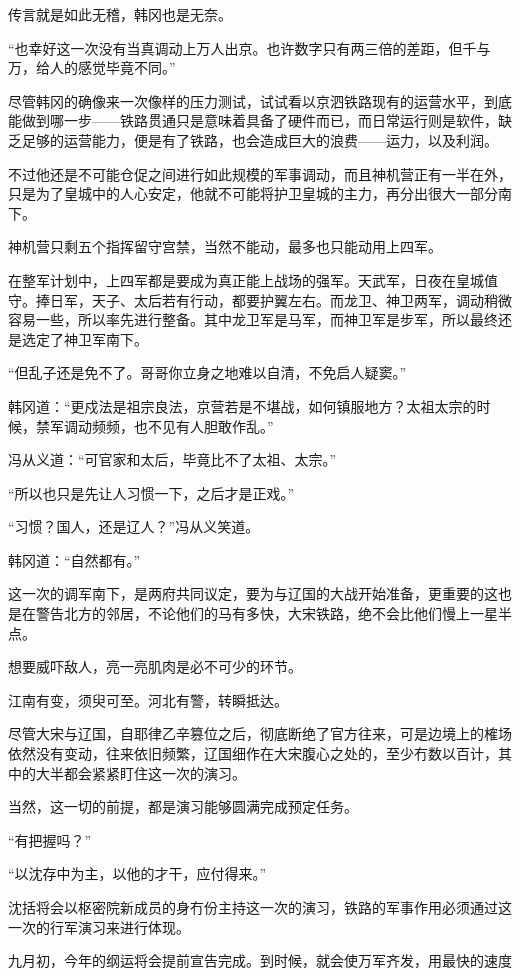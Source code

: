 传言就是如此无稽，韩冈也是无奈。

“也幸好这一次没有当真调动上万人出京。也许数字只有两三倍的差距，但千与万，给人的感觉毕竟不同。”

尽管韩冈的确像来一次像样的压力测试，试试看以京泗铁路现有的运营水平，到底能做到哪一步——铁路贯通只是意味着具备了硬件而已，而日常运行则是软件，缺乏足够的运营能力，便是有了铁路，也会造成巨大的浪费——运力，以及利润。

不过他还是不可能仓促之间进行如此规模的军事调动，而且神机营正有一半在外，只是为了皇城中的人心安定，他就不可能将护卫皇城的主力，再分出很大一部分南下。

神机营只剩五个指挥留守宫禁，当然不能动，最多也只能动用上四军。

在整军计划中，上四军都是要成为真正能上战场的强军。天武军，日夜在皇城值守。捧日军，天子、太后若有行动，都要护翼左右。而龙卫、神卫两军，调动稍微容易一些，所以率先进行整备。其中龙卫军是马军，而神卫军是步军，所以最终还是选定了神卫军南下。

“但乱子还是免不了。哥哥你立身之地难以自清，不免启人疑窦。”

韩冈道：“更戍法是祖宗良法，京营若是不堪战，如何镇服地方？太祖太宗的时候，禁军调动频频，也不见有人胆敢作乱。”

冯从义道：“可官家和太后，毕竟比不了太祖、太宗。”

“所以也只是先让人习惯一下，之后才是正戏。”

“习惯？国人，还是辽人？”冯从义笑道。

韩冈道：“自然都有。”

这一次的调军南下，是两府共同议定，要为与辽国的大战开始准备，更重要的这也是在警告北方的邻居，不论他们的马有多快，大宋铁路，绝不会比他们慢上一星半点。

想要威吓敌人，亮一亮肌肉是必不可少的环节。

江南有变，须臾可至。河北有警，转瞬抵达。

尽管大宋与辽国，自耶律乙辛篡位之后，彻底断绝了官方往来，可是边境上的榷场依然没有变动，往来依旧频繁，辽国细作在大宋腹心之处的，至少冇数以百计，其中的大半都会紧紧盯住这一次的演习。

当然，这一切的前提，都是演习能够圆满完成预定任务。

“有把握吗？”

“以沈存中为主，以他的才干，应付得来。”

沈括将会以枢密院新成员的身冇份主持这一次的演习，铁路的军事作用必须通过这一次的行军演习来进行体现。

九月初，今年的纲运将会提前宣告完成。到时候，就会使万军齐发，用最快的速度

